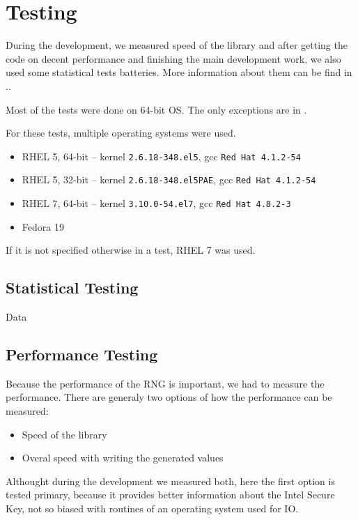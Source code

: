 
\chapter{Testing} \label{chap:testing}

During the development, we measured speed of the library and after getting the code on decent performance and finishing the main development work, we also used some statistical tests batteries. More information about them can be find in ..

Most of the tests were done on 64-bit OS. The only exceptions are in .

For these tests, multiple operating systems were used.
\begin{itemize}
 \item RHEL 5, 64-bit -- kernel {\tt 2.6.18-348.el5}, gcc {\tt Red Hat 4.1.2-54}
 \item RHEL 5, 32-bit -- kernel {\tt 2.6.18-348.el5PAE}, gcc {\tt Red Hat 4.1.2-54}
 \item RHEL 7, 64-bit -- kernel {\tt 3.10.0-54.el7}, gcc {\tt Red Hat 4.8.2-3}
 \item Fedora 19
\end{itemize}
If it is not specified otherwise in a test, RHEL 7 was used.




\section{Statistical Testing}\label{sec:testing:statistical-testing}
Data
\par {} %
\par {} %


\section{Performance Testing} \label{sec:testing:performance-testing}
Because the performance of the RNG is important, we had to measure the performance. There are generaly two options of how the performance can be measured:
\begin{itemize}
 \item Speed of the library
 \item Overal speed with writing the generated values
\end{itemize}
Althought during the development we measured both, here the first option is tested primary, because it provides better information about the Intel Secure Key, not so biased with routines of an operating system used for IO. 


